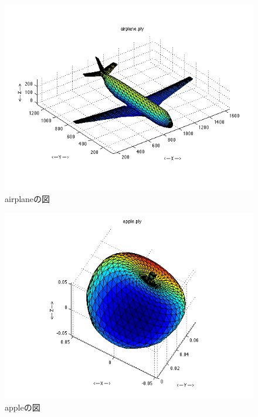 \documentclass[a4paper,11pt]{jsarticle}
\begin{document}
\begin{figure}[H]
  \centering
  \includegraphics[scale = 0.8]{../Figs/airplane.png} 
  \caption{airplaneの図}
  \label{airplane}
\end{figure}

\begin{figure}[H]
  \centering
  \includegraphics[scale = 0.8]{../Figs/apple.png} 
  \caption{appleの図}
  \label{apple}
\end{figure}
\end{document}
